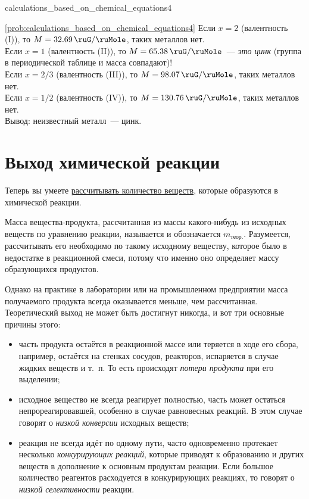 \begin{problem}{}{calculations_based_on_chemical_equations4}
\begin{sol}{\ref{prob:calculations_based_on_chemical_equations4}}
        Если $x = 2$ (валентность (I)), то $M = \qty{32,69}{\ruG\per\ruMole}$, таких металлов нет.\\
        Если $x = 1$ (валентность (II)), то $M = \qty{65,38}{\ruG\per\ruMole}$~--- \emph{это цинк} (группа в периодической таблице и масса совпадают)!\\
        Если $x = 2/3$ (валентность (III)), то $M = \qty{98,07}{\ruG\per\ruMole}$, таких металлов нет.\\
        Если $x = 1/2$ (валентность (IV)), то $M = \qty{130,76}{\ruG\per\ruMole}$, таких металлов нет.\\
        Вывод: неизвестный металл~--- цинк.
    \end{sol}
\end{problem}

\clearpage

\section{Выход химической реакции}

Теперь вы умеете \hyperref[sec:calculations_based_on_chemical_equations]{рассчитывать количество веществ}, которые образуются в химической реакции.

Масса вещества-продукта, рассчитанная из массы какого-нибудь из исходных веществ по уравнению реакции, называется  и обозначается $m_{\text{теор.}}$. Разумеется, рассчитывать его необходимо по такому исходному веществу, которое было в недостатке в реакционной смеси, потому что именно оно определяет массу образующихся продуктов.

Однако на практике в лаборатории или на промышленном предприятии масса получаемого продукта всегда оказывается меньше, чем рассчитанная. Теоретический выход не может быть достигнут никогда, и вот три основные причины этого:

\begin{itemize}
    \item часть продукта остаётся в реакционной массе или теряется в ходе его сбора, например, остаётся на стенках сосудов, реакторов, испаряется в случае жидких веществ и т.~п. То есть происходят \emph{потери продукта} при его выделении;
    \item исходное вещество не всегда реагирует полностью, часть может остаться непрореагировавшей, особенно в случае равновесных реакций. В этом случае говорят о \emph{низкой конверсии} исходных веществ;
    \item реакция не всегда идёт по одному пути, часто одновременно протекает несколько \emph{конкурирующих реакций}, которые приводят к образованию и других веществ в дополнение к основным продуктам реакции. Если большое количество реагентов расходуется в конкурирующих реакциях, то говорят о \emph{низкой селективности} реакции.
\end{itemize}

